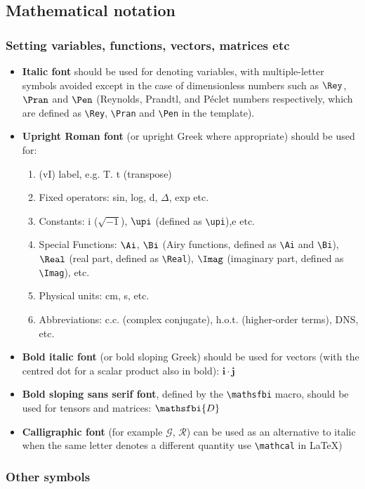 \documentclass[lineno]{JFM-FLM_Au}
\begin{document}
\subsection{Mathematical notation}
\subsubsection{Setting variables, functions, vectors, matrices etc}
\begin{itemize} \label{sec:MathNot}
\item {\bf Italic font} should be used for denoting variables, with multiple-letter symbols avoided except in the case of dimensionless numbers such as $\Rey$, $\Pran$ and $\Pen$ (Reynolds, Prandtl, and P\'eclet numbers respectively, which are defined as \verb}\Rey}, \verb}\Pran} and \verb}\Pen} in the template).
\item {\bf Upright Roman font} (or upright Greek where appropriate) should be used for:
\begin{enumerate}%
\item (vI) label, e.g.  T. t (transpose)
\item Fixed operators: sin, log, d, $\Delta$, exp etc.
\item Constants: i ($\sqrt{-1}$), $\upi$ (defined as \verb}\upi}),e  etc.
\item Special Functions: $\Ai$, $\Bi$ (Airy functions, defined as \verb}\Ai} and \verb}\Bi}), $\Real$ (real part, defined as \verb}\Real}), $\Imag$ (imaginary part, defined as \verb}\Imag}), etc.
\item Physical units: cm, s, etc.
\item Abbreviations: c.c. (complex conjugate), h.o.t. (higher-order terms), DNS, etc.
\end{enumerate}
\item {\bf Bold italic font} (or bold sloping Greek) should be used for vectors (with the centred dot for a scalar product also in bold): $\boldsymbol{i \cdot j}$
\item {\bf Bold sloping sans serif font}, defined by the \verb}\mathsfbi} macro, should be used for tensors and matrices: $\mathsfbi{D}$
\item {\bf Calligraphic font} (for example $\mathcal{G}$, $\mathcal{R}$) can be used as an alternative to italic when the same letter denotes a different quantity use \verb}\mathcal} in \LaTeX)
\end{itemize}

\subsubsection{Other symbols}
\end{document}
